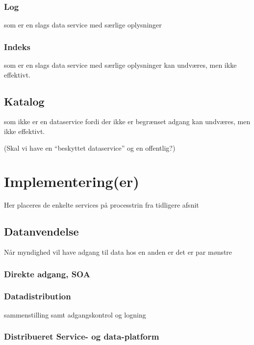 \subsubsection{Log}\label{log}

som er en slags data service med særlige oplysninger

\subsubsection{Indeks}\label{indeks-1}

som er en slags data service med særlige oplysninger kan undværes, men
ikke effektivt.

\subsection{Katalog}\label{katalog-1}

som ikke er en dataservice fordi der ikke er begrænset adgang kan
undværes, men ikke effektivt.

(Skal vi have en ``beskyttet dataservice'' og en offentlig?)

\section{Implementering(er)}\label{implementeringer}

Her placeres de enkelte services på processtrin fra tidligere afsnit

\subsection{Datanvendelse}\label{datanvendelse}

Når myndighed vil have adgang til data hos en anden er det er par
mønstre

\subsubsection{Direkte adgang, SOA}\label{direkte-adgang-soa}

\subsubsection{Datadistribution}\label{datadistribution}

sammenstilling samt adgangskontrol og logning

\subsubsection{Distribueret Service- og
data-platform}\label{distribueret-service--og-data-platform}

